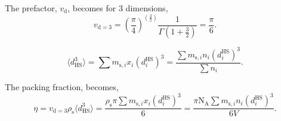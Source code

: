 \documentclass[english]{../thermomemo/thermomemo}
\newcommand*{\lb}{\left(}
\newcommand*{\rb}{\right)}
\newcommand{\hs}{\text{HS}\xspace}
\newcommand{\seg}{\ensuremath{\text{s}}\xspace}
\newcommand{\NA}{\ensuremath{\text{N}_{\text{A}}}\xspace}
\begin{document}
The prefactor, $v_{\text{d}}$, becomes for 3 dimensions,
\begin{equation}
  \label{eq:v_d}
  v_{\text{d}=3} = \lb \frac{\pi}{4} \rb^{\lb\frac{3}{2}\rb}\frac{1}{\Gamma\lb 1
    + \frac{3}{2} \rb} = \frac{ \pi }{6 }.
\end{equation}

\begin{equation}
  \label{eq:d_bracket}
  \langle d_\hs^3 \rangle  =  \sum m_{\seg,i} x_i \lb d_i^\hs \rb^3 = \frac{\sum m_{\seg,i} n_i \lb d_i^\hs \rb^3}{\sum  n_i}.
\end{equation}

The packing fraction, becomes,
\begin{equation}
  \label{eq:eta_2}
  \eta = v_{\text{d}=3} \rho_\seg \langle d_\hs^3 \rangle =  \frac{\rho_\seg \pi \sum m_{\seg,i} x_i \lb d_i^\hs \rb^3}{6} = \frac{ \pi \NA \sum m_{\seg,i} n_i \lb d_i^\hs \rb^3}{6 V}.
\end{equation}
\end{document}
